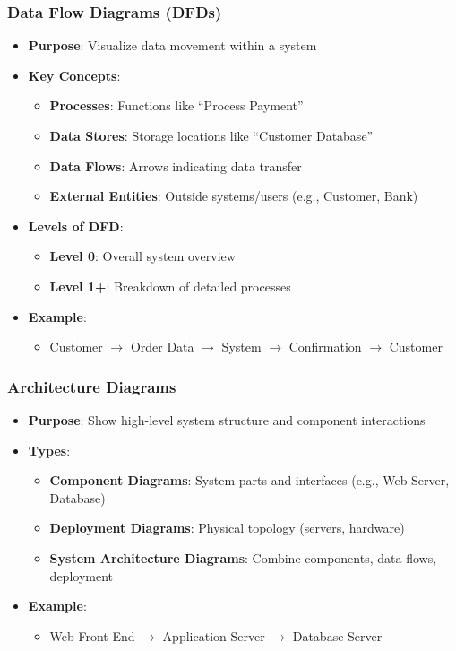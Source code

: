 \documentclass{beamer}
\begin{document}
\begin{frame}[fragile]
    \frametitle{Data Flow Diagrams (DFDs)}
    \begin{itemize}
        \item \textbf{Purpose}: Visualize data movement within a system
        \item \textbf{Key Concepts}:
        \begin{itemize}
            \item \textbf{Processes}: Functions like “Process Payment”
            \item \textbf{Data Stores}: Storage locations like “Customer Database”
            \item \textbf{Data Flows}: Arrows indicating data transfer
            \item \textbf{External Entities}: Outside systems/users (e.g., Customer, Bank)
        \end{itemize}
        \item \textbf{Levels of DFD}:
        \begin{itemize}
            \item \textbf{Level 0}: Overall system overview
            \item \textbf{Level 1+}: Breakdown of detailed processes
        \end{itemize}
        \item \textbf{Example}: 
        \begin{itemize}
            \item Customer $\rightarrow$ Order Data $\rightarrow$ System $\rightarrow$ Confirmation $\rightarrow$ Customer
        \end{itemize}
    \end{itemize}
\end{frame}

\begin{frame}[fragile]
    \frametitle{Architecture Diagrams}
    \begin{itemize}
        \item \textbf{Purpose}: Show high-level system structure and component interactions
        \item \textbf{Types}:
        \begin{itemize}
            \item \textbf{Component Diagrams}: System parts and interfaces (e.g., Web Server, Database)
            \item \textbf{Deployment Diagrams}: Physical topology (servers, hardware)
            \item \textbf{System Architecture Diagrams}: Combine components, data flows, deployment
        \end{itemize}
        \item \textbf{Example}: 
        \begin{itemize}
            \item Web Front-End $\rightarrow$ Application Server $\rightarrow$ Database Server
        \end{itemize}
    \end{itemize}
\end{frame}
\end{document}
